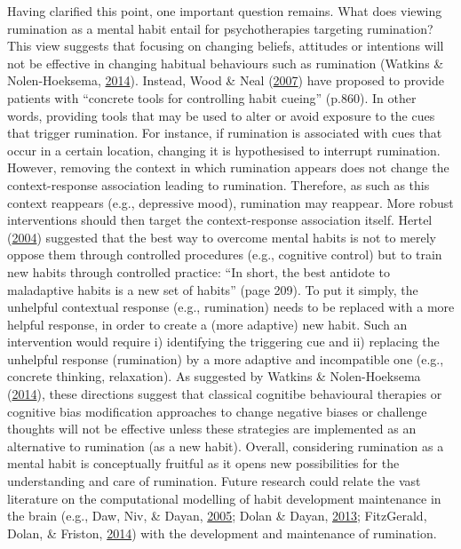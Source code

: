 \documentclass[a4paper,12pt,twoside,onecolumn,openright,final,oldfontcommands]{memoir}
\begin{document}
Having clarified this point, one important question remains. What does viewing rumination as a mental habit entail for psychotherapies targeting rumination? This view suggests that focusing on changing beliefs, attitudes or intentions will not be effective in changing habitual behaviours such as rumination (Watkins \& Nolen-Hoeksema, \protect\hyperlink{ref-watkins_habit-goal_2014}{2014}). Instead, Wood \& Neal (\protect\hyperlink{ref-wood_new_2007}{2007}) have proposed to provide patients with \enquote{concrete tools for controlling habit cueing} (p.860). In other words, providing tools that may be used to alter or avoid exposure to the cues that trigger rumination. For instance, if rumination is associated with cues that occur in a certain location, changing it is hypothesised to interrupt rumination. However, removing the context in which rumination appears does not change the context-response association leading to rumination. Therefore, as such as this context reappears (e.g., depressive mood), rumination may reappear. More robust interventions should then target the context-response association itself. Hertel (\protect\hyperlink{ref-hertel_memory_2004}{2004}) suggested that the best way to overcome mental habits is not to merely oppose them through controlled procedures (e.g., cognitive control) but to train new habits through controlled practice: \enquote{In short, the best antidote to maladaptive habits is a new set of habits} (page 209). To put it simply, the unhelpful contextual response (e.g., rumination) needs to be replaced with a more helpful response, in order to create a (more adaptive) new habit. Such an intervention would require i) identifying the triggering cue and ii) replacing the unhelpful response (rumination) by a more adaptive and incompatible one (e.g., concrete thinking, relaxation). As suggested by Watkins \& Nolen-Hoeksema (\protect\hyperlink{ref-watkins_habit-goal_2014}{2014}), these directions suggest that classical cognitibe behavioural therapies or cognitive bias modification approaches to change negative biases or challenge thoughts will not be effective unless these strategies are implemented as an alternative to rumination (as a new habit). Overall, considering rumination as a mental habit is conceptually fruitful as it opens new possibilities for the understanding and care of rumination. Future research could relate the vast literature on the computational modelling of habit development maintenance in the brain (e.g., Daw, Niv, \& Dayan, \protect\hyperlink{ref-daw_uncertainty-based_2005}{2005}; Dolan \& Dayan, \protect\hyperlink{ref-dolan_goals_2013}{2013}; FitzGerald, Dolan, \& Friston, \protect\hyperlink{ref-fitzgerald_model_2014}{2014}) with the development and maintenance of rumination.
\end{document}
